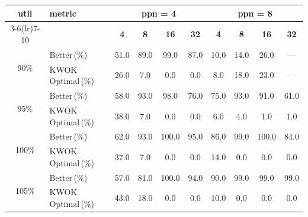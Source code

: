 \begin{tabular}{@{}c l *{8}{c}@{}}
\toprule
\multirow{2}{*}{\textbf{util}} & \multirow{2}{*}{\textbf{metric}} &\multicolumn{4}{c}{\textbf{ppn = 4}} & \multicolumn{4}{c}{\textbf{ppn = 8}}\\
\cmidrule(lr){3-6}\cmidrule(lr){7-10}
 &  & \textbf{4} & \textbf{8} & \textbf{16} & \textbf{32} & \textbf{4} & \textbf{8} & \textbf{16} & \textbf{32}\\
\midrule
\multirow{2}{*}{90\%}
& Better\,(\%) & 51.0 & 89.0 & 99.0 & 87.0 & 10.0 & 14.0 & 26.0 & \multicolumn{1}{c}{—} \\
& KWOK\,Optimal\,(\%) & 26.0 & 7.0 & 0.0 & 0.0 & 8.0 & 18.0 & 23.0 & \multicolumn{1}{c}{—} \\
\midrule
\multirow{2}{*}{95\%}
& Better\,(\%) & 58.0 & 93.0 & 98.0 & 76.0 & 75.0 & 93.0 & 91.0 & 61.0 \\
& KWOK\,Optimal\,(\%) & 38.0 & 7.0 & 0.0 & 0.0 & 6.0 & 4.0 & 1.0 & 1.0 \\
\midrule
\multirow{2}{*}{100\%}
& Better\,(\%) & 62.0 & 93.0 & 100.0 & 95.0 & 86.0 & 99.0 & 100.0 & 84.0 \\
& KWOK\,Optimal\,(\%) & 37.0 & 7.0 & 0.0 & 0.0 & 14.0 & 0.0 & 0.0 & 0.0 \\
\midrule
\multirow{2}{*}{105\%}
& Better\,(\%) & 57.0 & 81.0 & 100.0 & 94.0 & 90.0 & 99.0 & 99.0 & 99.0 \\
& KWOK\,Optimal\,(\%) & 43.0 & 18.0 & 0.0 & 0.0 & 10.0 & 0.0 & 0.0 & 0.0 \\
\bottomrule
\end{tabular}
